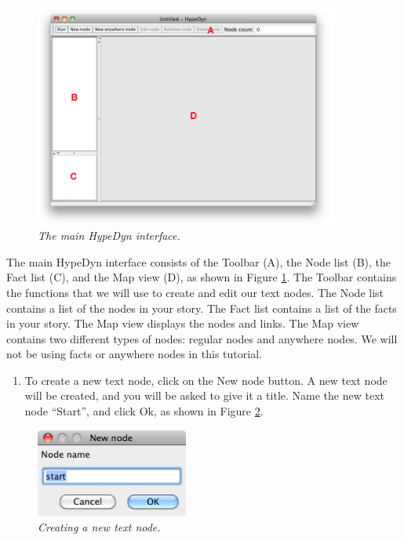 \documentclass{article}
\begin{document}
\begin{figure}[ht]
  \centering
  \includegraphics[width=10cm]{images/hypedyn-tutorial-1-figure-2}
  \caption{\textit{The main HypeDyn interface.}}
  \label{fig:tut1:hypedyn}
\end{figure} 

The main HypeDyn interface consists of the Toolbar (A), the Node list (B), the
Fact list (C), and the Map view (D), as shown in Figure \ref{fig:tut1:hypedyn}.
The Toolbar contains the functions that we will use to create and edit our text
nodes. The Node list contains a list of the nodes in your story. The Fact list
contains a list of the facts in your story.
The Map view displays the nodes and links. The Map view contains two different
types of nodes: regular nodes and anywhere nodes. We will not be using facts or
anywhere nodes in this tutorial.

\begin{enumerate}
  \item To create a new text node, click on the New node button. A new text node
  will be created, and you will be asked to give it a title. Name the new text
  node ``Start'', and click Ok, as shown in Figure \ref{fig:tut1:new_node}.
\end{enumerate}

 
\begin{figure}[ht]
  \centering
  \includegraphics[width=5cm]{images/hypedyn-tutorial-1-figure-3}
  \caption{\textit{Creating a new text node.}}
  \label{fig:tut1:new_node}
\end{figure} 
\end{document}
